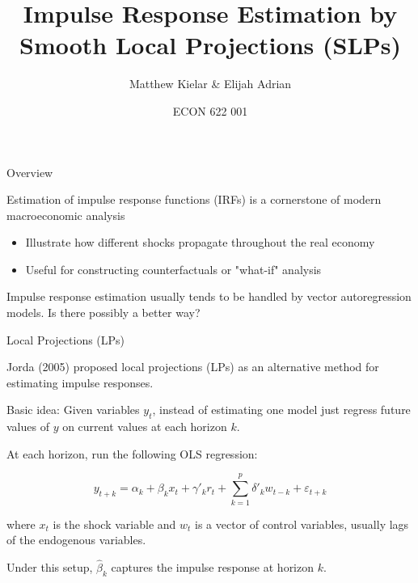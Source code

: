 \documentclass{beamer}
\title{Impulse Response Estimation by Smooth Local Projections (SLPs)}
\subtitle{Matthew Kielar \& Elijah Adrian}
\date[]{ECON 622 001}
\begin{document}
\begin{frame}
    \titlepage
\end{frame}

\begin{frame}{Overview}

    Estimation of impulse response functions (IRFs) is a cornerstone of modern macroeconomic analysis \bigskip

    \begin{itemize}
        
        \item Illustrate how different shocks propagate throughout the real economy
        \item Useful for constructing counterfactuals or "what-if" analysis

    \end{itemize} \bigskip

    Impulse response estimation usually tends to be handled by vector autoregression models. Is there
    possibly a better way?

\end{frame}

\begin{frame}{Local Projections (LPs)}

    Jorda (2005) proposed local projections (LPs) as an alternative method for estimating
    impulse responses. \bigskip

    Basic idea: Given variables $y_t$, instead of estimating one model just regress future
    values of $y$ on current values at each horizon $k$. \bigskip
    
    At each horizon, run the following OLS regression:

    \begin{equation*}
        y_{t+k} = \alpha_k + \beta_k x_t + \gamma'_k r_t + \sum_{k=1}^p \delta'_k w_{t-k} + \varepsilon_{t+k}
    \end{equation*}

    where $x_t$ is the shock variable and $w_t$ is a vector of control variables, usually lags of
    the endogenous variables. \bigskip
   
    Under this setup, $\hat{\beta}_k$ captures the impulse response at horizon $k$. 

\end{frame}
\end{document}
